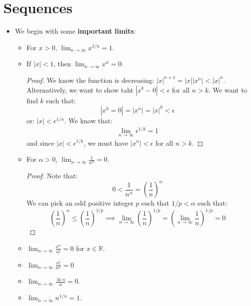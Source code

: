 \section{Sequences}
\begin{itemize}
    \item We begin with some \textbf{important limits}:
    \begin{itemize}
        \item For $x>0$, $\lim_{n\to\infty} x^{1/n} = 1$.
        \item If $|x| < 1$, then $\lim_{n\to \infty} x^n = 0$.
        \begin{proof}
            We know the function is decreasing: $|x|^{n+1} = |x| |x^n| < |x|^n$. Alternatively, we want to show taht $|x^k - 0| < \epsilon$ for all $n > k$. We want to find $k$ such that:
            \begin{equation}
                |x^k=0| = |x^n| = |x|^k < \epsilon
            \end{equation}
            or: $|x|<\epsilon^{1/n}$. We know that:
            \begin{align}
                \lim_{n\to\infty}\epsilon^{1/k} = 1
            \end{align}
            and since $|x|<\epsilon^{1/k}$, we must have $|x^n|<\epsilon$ for all $n>k$.
        \end{proof}
        \item For $\alpha > 0$, $\lim_{n\to\infty} \frac{1}{n^\alpha}=0$.
        \begin{proof}
            Note that:
            \begin{equation}
                0 < \frac{1}{n^\alpha} = \left(\frac{1}{n}\right)^\alpha
            \end{equation}
            We can pick an odd positive integer $p$ such that $1/p < \alpha$ such that:
            \begin{equation}
                \left(\frac{1}{n}\right)^\alpha \le \left(\frac{1}{n}\right)^{1/p} \implies \lim_{n\to\infty}\left(\frac{1}{n}\right)^{1/p} = \left(\lim_{n\to\infty} \frac{1}{n}\right)^{1/p}=0
            \end{equation}
        \end{proof}
        \item $\lim_{n\to\infty} \frac{x^n}{n!}=0$ for $x\in \mathbb{R}$.
        \item $\lim_{n\to\infty} \frac{n!}{n^n}=0$
        \item $\lim_{n\to\infty} \frac{\ln n}{n} = 0$.
        \item $\lim_{n\to\infty} n ^{1/n} = 1$.

\end{itemize}
\end{itemize}

